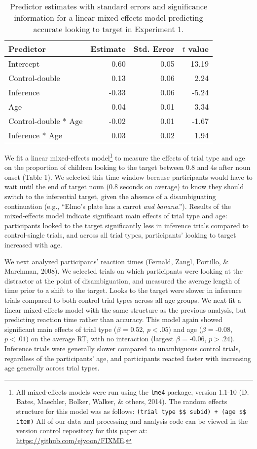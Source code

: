 \documentclass[a4paper,man,apacite,floatsintext]{apa6}
\begin{document}
\begin{table}[tb]
\centering
\begin{tabular}{lrrr}
 Predictor & Estimate & Std. Error & $t$ value \\ 
  \hline
Intercept & 0.60 & 0.05 & 13.19 \\ 
  Control-double & 0.13 & 0.06 & 2.24 \\ 
  Inference & -0.33 & 0.06 & -5.24 \\ 
  Age & 0.04 & 0.01 & 3.34 \\ 
  Control-double * Age & -0.02 & 0.01 & -1.67 \\ 
  Inference * Age & 0.03 & 0.02 & 1.94 \\ 
   \hline
\end{tabular}
\caption{Predictor estimates with standard errors and significance information for a linear mixed-effects model predicting accurate looking to target in Experiment 1.} 
\label{tab:exp1_tab}
\end{table}

We fit a linear mixed-effects model\footnote{All mixed-effects models
  were run using the \texttt{lme4} package, version 1.1-10 (D. Bates,
  Maechler, Bolker, Walker, \& others, 2014). The random effects
  structure for this model was as follows:
  \texttt{(trial type \$\textbar{}\$ subid) + (age \$\textbar{}\$ item)}
  All of our data and processing and analysis code can be viewed in the
  version control repository for this paper at:
  \url{https://github.com/ejyoon/FIXME}.} to measure the effects of
trial type and age on the proportion of children looking to the target
between 0.8 and 4s after noun onset (Table 1). We selected this time
window because participants would have to wait until the end of target
noun (0.8 seconds on average) to know they should switch to the
inferential target, given the absence of a disambiguating continuation
(e.g., ``Elmo's plate has a carrot \emph{and banana}.''). Results of the
mixed-effects model indicate significant main effects of trial type and
age: participants looked to the target significantly less in inference
trials compared to control-single trials, and across all trial types,
participants' looking to target increased with age.

We next analyzed participants' reaction times (Fernald, Zangl, Portillo,
\& Marchman, 2008). We selected trials on which participants were
looking at the distractor at the point of disambiguation, and measured
the average length of time prior to a shift to the target. Looks to the
target were slower in inference trials compared to both control trial
types across all age groups. We next fit a linear mixed-effects model
with the same structure as the previous analysis, but predicting
reaction time rather than accuracy. This model again showed significant
main effects of trial type (\(\beta\) = 0.52, \(p <.05\)) and age
(\(\beta\) = -0.08, \(p <.01\)) on the average RT, with no interaction
(largest \(\beta\) = -0.06, \(p >.24\)). Inference trials were generally
slower compared to unambiguous control trials, regardless of the
participants' age, and participants reacted faster with increasing age
generally across trial types.
\end{document}
